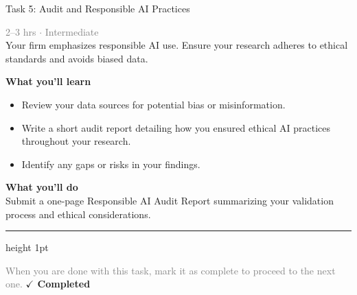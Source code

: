 \documentclass[10pt,a4paper]{article}
\begin{document}
\begin{taskbox}{Task 5: Audit and Responsible AI Practices}

    {\small \textcolor{gray}{2--3 hrs $\cdot$ Intermediate}}\\[12pt]

      
Your firm emphasizes responsible AI use. Ensure your research adheres to ethical standards and avoids biased data.  


\vspace{8pt}
{\large \textbf{\textcolor{brandLight}{What you'll learn}}}\\[4pt]  
\begin{itemize}
    \item Review your data sources for potential bias or misinformation.  
    \item Write a short audit report detailing how you ensured ethical AI practices throughout your research.  
    \item Identify any gaps or risks in your findings.  
\end{itemize}

\vspace{8pt}
{\large \textbf{\textcolor{brandLight}{What you'll do}}}\\[4pt]  
Submit a one-page Responsible AI Audit Report summarizing your validation process and ethical considerations.\par

    \vspace{16pt}

    \textcolor{cardBorder}{\hrule height 1pt}\vspace{8pt}

    \small \textcolor{gray}{When you are done with this task, mark it as complete to proceed to the next one.} \hfill \textbf{\textcolor{brandDark}{$\checkmark$ Completed}}

\end{taskbox}
\end{document}
